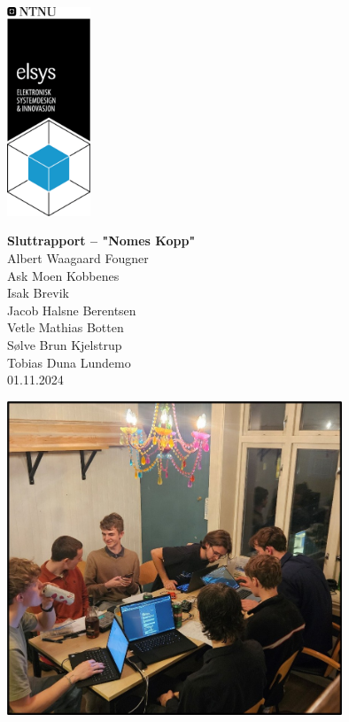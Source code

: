\documentclass{article}
\begin{document}
\begin{titlepage}
    \begin{minipage}{0.3\textwidth}
        \includegraphics[width=2.5cm]{Elsyslogo.png}
    \end{minipage}
    \hfill
    \begin{minipage}{0.65\textwidth}
        \raggedright
        \LARGE \textbf{Sluttrapport – "Nomes Kopp"} \\[1em]
        \large Albert Waagaard Fougner \\ Ask Moen Kobbenes \\ Isak Brevik \\ Jacob Halsne Berentsen \\ Vetle Mathias Botten \\ Sølve Brun Kjelstrup \\ Tobias Duna Lundemo \\[1em]
        \normalsize 01.11.2024
    \end{minipage}
    \vfill
    \begin{center}
        \includegraphics[width=10cm]{Gruppebilde1.jpg}
    \end{center}
\end{titlepage}
\newpage
\tableofcontents{}
\end{document}
